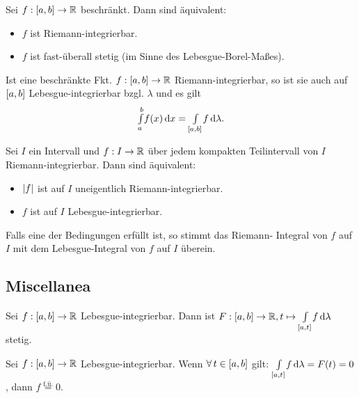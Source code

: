\documentclass{cheat-sheet}
\newcommand{\fue}{\overset{\text{f.ü.}}} %
\theoremstyle{definition}
\begin{document}
\begin{satz}
  Sei $f : \left[ a, b \right] \to \mathbb{R}$ beschränkt. Dann sind äquivalent:
  \begin{itemize}
    \item $f$ ist Riemann-integrierbar.
    \item $f$ ist fast-überall stetig (im Sinne des Lebesgue-Borel-Maßes).
  \end{itemize}
\end{satz}

\begin{satz}
  Ist eine beschränkte Fkt. $f : \left[ a, b \right] \to \mathbb{R}$ Riemann-integrierbar, so ist sie auch auf $\left[ a, b \right]$ Lebesgue-integrierbar bzgl. $\lambda$ und es gilt
  \[ {\textstyle \int\limits_{a}^{b}} f(x) \,\mathrm{d} x = {\textstyle \int\limits_{\left[ a, b \right]}^{}} f \,\mathrm{d} \lambda. \]
\end{satz}

\begin{samepage}
\begin{satz}
  Sei $I$ ein Intervall und $f : I \to \mathbb{R}$ über jedem kompakten Teilintervall von $I$ Riemann-integrierbar. Dann sind äquivalent:
  \begin{itemize}
    \item $\lvert f\rvert$ ist auf $I$ uneigentlich Riemann-integrierbar.
    \item $f$ ist auf $I$ Lebesgue-integrierbar.
  \end{itemize}
  Falls eine der Bedingungen erfüllt ist, so stimmt das Riemann- Integral von $f$ auf $I$ mit dem Lebesgue-Integral von $f$ auf $I$ überein.
\end{satz}

\subsection{Miscellanea}
\end{samepage}

\begin{satz}
  Sei $f : \left[ a, b \right] \to \mathbb{R}$ Lebesgue-integrierbar. Dann ist $F : \left[ a, b \right] \to \mathbb{R}, t \mapsto {\textstyle \int\limits_{\left[ a, t \right]}^{}} f \,\mathrm{d} \lambda$ stetig.
\end{satz}

\begin{satz}
  Sei $f : \left[ a, b \right] \to \mathbb{R}$ Lebesgue-integrierbar. Wenn $\forall \, t \in \left[ a, b \right]$ gilt: ${\textstyle \int\limits_{\left[ a, t \right]}^{}} f \,\mathrm{d} \lambda = F(t) = 0$, dann $f \fue= 0$.
\end{satz}
\end{document}
